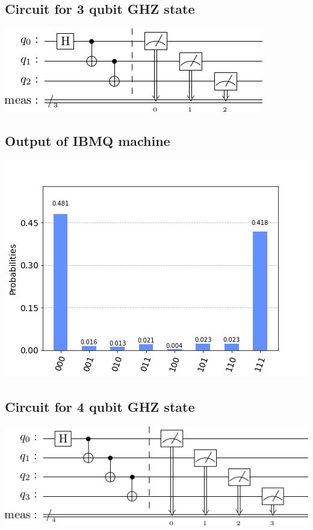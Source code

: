 \documentclass[a4paper]{article}
\begin{document}
    \begin{answer}[Question 2]
    \subsection*{Circuit for 3 qubit GHZ state}
       \includegraphics{ghz-3.png} 
    \subsection*{Output of IBMQ machine}
        \includegraphics[scale = 0.75]{w-3-out.png}
    \subsection*{Circuit for 4 qubit GHZ state}
        \includegraphics[scale=0.8]{ghz-4.png}

\end{answer}
\end{document}
